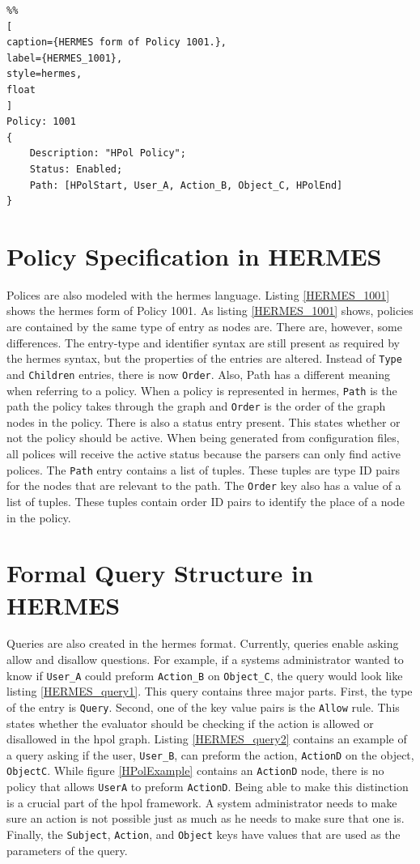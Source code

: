 \documentclass[12pt,letterpaper]{report}
\begin{document}
\begin{lstlisting}%%
[
caption={HERMES form of Policy 1001.},
label={HERMES_1001},
style=hermes,
float
]
Policy: 1001
{
	Description: "HPol Policy";
	Status: Enabled;
	Path: [HPolStart, User_A, Action_B, Object_C, HPolEnd]
}
\end{lstlisting}

\section{Policy Specification in HERMES}
Polices are also modeled with the \ac{hermes} language. Listing \ref{HERMES_1001} shows the \ac{hermes} form of Policy 1001. As listing \ref{HERMES_1001} shows, policies are contained by the same type of entry as nodes are. There are, however, some differences. The entry-type and identifier syntax are still present as required by the \ac{hermes} syntax, but the properties of the entries are altered. Instead of \texttt{Type} and \texttt{Children} entries, there is now \texttt{Order}. Also, Path has a different meaning when referring to a policy. When a policy is represented in \ac{hermes}, \texttt{Path} is the path the policy takes through the graph and \texttt{Order} is the order of the graph nodes in the policy. There is also a status entry present. This states whether or not the policy should be active. When being generated from configuration files, all polices will receive the active status because the parsers can only find active polices. The \texttt{Path} entry contains a list of tuples. These tuples are type ID pairs for the nodes that are relevant to the path. The \texttt{Order} key also has a value of a list of tuples. These tuples contain order ID pairs to identify the place of a node in the policy.

\section{Formal Query Structure in HERMES}
Queries are also created in the \ac{hermes} format. Currently, queries enable asking allow and disallow questions. For example, if a systems administrator wanted to know if \texttt{User\_A} could preform \texttt{Action\_B} on \texttt{Object\_C}, the query would look like listing \ref{HERMES_query1}. This query contains three major parts. First, the type of the entry is \texttt{Query}. Second, one of the key value pairs is the \texttt{Allow} rule. This states whether the evaluator should be checking if the action is allowed or disallowed in the \ac{hpol} graph. Listing \ref{HERMES_query2} contains an example of a query asking if the user, \texttt{User\_B}, can preform the action, \texttt{Action\textunderscore D} on the object, \texttt{Object\textunderscore C}. While figure \ref{HPolExample} contains an \texttt{Action\textunderscore D} node, there is no policy that allows \texttt{User\textunderscore A} to preform \texttt{Action\textunderscore D}. Being able to make this distinction is a crucial part of the \ac{hpol} framework. A system administrator needs to make sure an action is not possible just as much as he needs to make sure that one is. Finally, the \texttt{Subject}, \texttt{Action}, and \texttt{Object} keys have values that are used as the parameters of the query.
\end{document}
